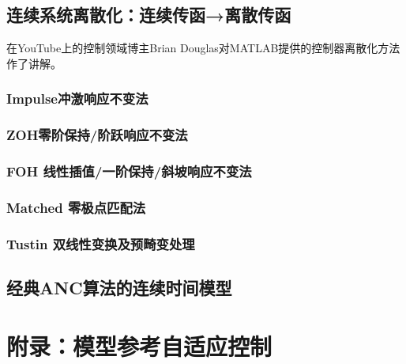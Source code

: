\documentclass[
  12pt,
  a4paper
]{article}
\begin{document}
\subsection{连续系统离散化：连续传函→离散传函}\label{ux8fdeux7eedux7cfbux7edfux79bbux6563ux5316ux8fdeux7eedux4f20ux51fdux79bbux6563ux4f20ux51fd}

在YouTube上的控制领域博主Brian
Douglas对MATLAB提供的控制器离散化方法作了讲解。

\subsubsection{Impulse冲激响应不变法}\label{impulseux51b2ux6fc0ux54cdux5e94ux4e0dux53d8ux6cd5}

\subsubsection{ZOH零阶保持/阶跃响应不变法}\label{zohux96f6ux9636ux4fddux6301ux9636ux8dc3ux54cdux5e94ux4e0dux53d8ux6cd5}

\subsubsection{FOH
线性插值/一阶保持/斜坡响应不变法}\label{foh-ux7ebfux6027ux63d2ux503cux4e00ux9636ux4fddux6301ux659cux5761ux54cdux5e94ux4e0dux53d8ux6cd5}

\subsubsection{Matched
零极点匹配法}\label{matched-ux96f6ux6781ux70b9ux5339ux914dux6cd5}

\subsubsection{Tustin
双线性变换及预畸变处理}\label{tustin-ux53ccux7ebfux6027ux53d8ux6362ux53caux9884ux7578ux53d8ux5904ux7406}

\subsection{经典ANC算法的连续时间模型}\label{ux7ecfux5178ancux7b97ux6cd5ux7684ux8fdeux7eedux65f6ux95f4ux6a21ux578b}

\section{附录：模型参考自适应控制}\label{ux9644ux5f55ux6a21ux578bux53c2ux8003ux81eaux9002ux5e94ux63a7ux5236}
\end{document}
